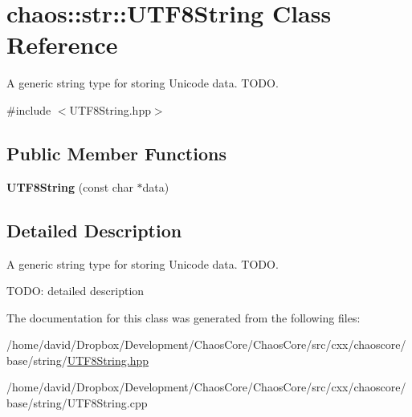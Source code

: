 \hypertarget{classchaos_1_1str_1_1_u_t_f8_string}{\section{chaos\-:\-:str\-:\-:U\-T\-F8\-String Class Reference}
\label{classchaos_1_1str_1_1_u_t_f8_string}
}


A generic string type for storing Unicode data. T\-O\-D\-O.  




{\ttfamily \#include $<$U\-T\-F8\-String.\-hpp$>$}

\subsection*{Public Member Functions}
\begin{DoxyCompactItemize}
\item 
\hypertarget{classchaos_1_1str_1_1_u_t_f8_string_af506696bfe777057c4a7e6b6acf19dab}{{\bfseries U\-T\-F8\-String} (const char $\ast$data)}\label{classchaos_1_1str_1_1_u_t_f8_string_af506696bfe777057c4a7e6b6acf19dab}

\end{DoxyCompactItemize}


\subsection{Detailed Description}
A generic string type for storing Unicode data. T\-O\-D\-O. 

T\-O\-D\-O\-: detailed description 

The documentation for this class was generated from the following files\-:\begin{DoxyCompactItemize}
\item 
/home/david/\-Dropbox/\-Development/\-Chaos\-Core/\-Chaos\-Core/src/cxx/chaoscore/base/string/\hyperlink{_u_t_f8_string_8hpp}{U\-T\-F8\-String.\-hpp}\item 
/home/david/\-Dropbox/\-Development/\-Chaos\-Core/\-Chaos\-Core/src/cxx/chaoscore/base/string/U\-T\-F8\-String.\-cpp\end{DoxyCompactItemize}
